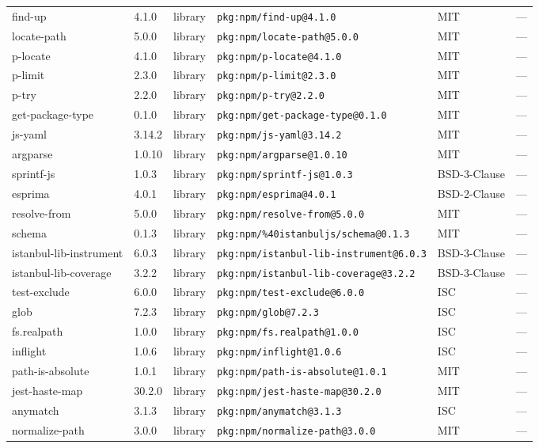 \documentclass[11pt]{article}
\begin{document}
\begin{longtable}{|l|l|l|p{2.2cm}|l|p{4cm}|}
find-up & 4.1.0 & library & \texttt{pkg:npm/find-up@4.1.0} & MIT & — \\
locate-path & 5.0.0 & library & \texttt{pkg:npm/locate-path@5.0.0} & MIT & — \\
p-locate & 4.1.0 & library & \texttt{pkg:npm/p-locate@4.1.0} & MIT & — \\
p-limit & 2.3.0 & library & \texttt{pkg:npm/p-limit@2.3.0} & MIT & — \\
p-try & 2.2.0 & library & \texttt{pkg:npm/p-try@2.2.0} & MIT & — \\
get-package-type & 0.1.0 & library & \texttt{pkg:npm/get-package-type@0.1.0} & MIT & — \\
js-yaml & 3.14.2 & library & \texttt{pkg:npm/js-yaml@3.14.2} & MIT & — \\
argparse & 1.0.10 & library & \texttt{pkg:npm/argparse@1.0.10} & MIT & — \\
sprintf-js & 1.0.3 & library & \texttt{pkg:npm/sprintf-js@1.0.3} & BSD-3-Clause & — \\
esprima & 4.0.1 & library & \texttt{pkg:npm/esprima@4.0.1} & BSD-2-Clause & — \\
resolve-from & 5.0.0 & library & \texttt{pkg:npm/resolve-from@5.0.0} & MIT & — \\
schema & 0.1.3 & library & \texttt{pkg:npm/\%40istanbuljs/schema@0.1.3} & MIT & — \\
istanbul-lib-instrument & 6.0.3 & library & \texttt{pkg:npm/istanbul-lib-instrument@6.0.3} & BSD-3-Clause & — \\
istanbul-lib-coverage & 3.2.2 & library & \texttt{pkg:npm/istanbul-lib-coverage@3.2.2} & BSD-3-Clause & — \\
test-exclude & 6.0.0 & library & \texttt{pkg:npm/test-exclude@6.0.0} & ISC & — \\
glob & 7.2.3 & library & \texttt{pkg:npm/glob@7.2.3} & ISC & — \\
fs.realpath & 1.0.0 & library & \texttt{pkg:npm/fs.realpath@1.0.0} & ISC & — \\
inflight & 1.0.6 & library & \texttt{pkg:npm/inflight@1.0.6} & ISC & — \\
path-is-absolute & 1.0.1 & library & \texttt{pkg:npm/path-is-absolute@1.0.1} & MIT & — \\
jest-haste-map & 30.2.0 & library & \texttt{pkg:npm/jest-haste-map@30.2.0} & MIT & — \\
anymatch & 3.1.3 & library & \texttt{pkg:npm/anymatch@3.1.3} & ISC & — \\
normalize-path & 3.0.0 & library & \texttt{pkg:npm/normalize-path@3.0.0} & MIT & — \\

\end{longtable}
\end{document}
